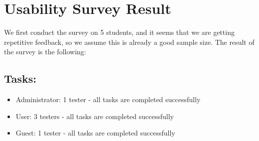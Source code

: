 \documentclass[12pt, titlepage]{article}
\begin{document}
\section{Usability Survey Result}\label{survey}
We first conduct the survey on 5 students, and it seems that we are getting repetitive feedback, so we assume this is already a good sample size. The result of the survey is the following:
\subsection{Tasks:}
\begin{itemize}
\item Administrator: 1 tester - all tasks are completed successfully 
\item User: 3 testers - all tasks are completed successfully
\item Guest: 1 tester - all tasks are completed successfully
\end{itemize}
\end{document}
